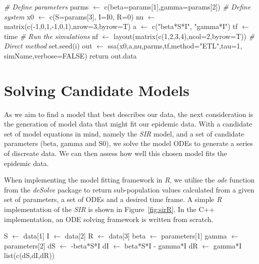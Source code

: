 \begin{algorithm}
  \begin{algorithmic}
    \State \emph{\# Define parameters}
    \State parms $\gets$ c(beta=params[1],gamma=params[2])
    \State
    \State \emph{\# Define system}
    \State x0 $\gets$ c(S=params[3], I=I0, R=0) 
    \State nu $\gets$ matrix(c(-1,0,1,-1,0,1),nrow=3,byrow=T)
    \State a  $\gets$ c("beta*S*I", "gamma*I")  
    \State tf $\gets$ time 
    \State
    \State \emph{\# Run the simulations}
    \State nf $\gets$ layout(matrix(c(1,2,3,4),ncol=2,byrow=T))
    \State
    \State \emph{\# Direct method}
    \State set.seed(i)
    \State out $\gets$ ssa(x0,a,nu,parms,tf,method="ETL",tau=1,
    simName,verbose=FALSE)
    \State return out.data
\EndFunction
\label{algorithm:gillespie}      
 
\end{algorithmic}
\end{algorithm}


\section{Solving Candidate Models}
As we aim to find a model that best describes our data, the next
consideration is the generation of model data that might fit our
epidemic data. With a candidate set of model equations in mind,
namely the \emph{SIR} model, and a set of candidate parameters (beta,
gamma and S0), we solve the model ODEs to generate a series of
discreate data. We can then assess how well this chosen model fits the
epidemic data.

When implementing the model fitting
framework in \emph{R}, we utilise the \emph{ode} function from the
\emph{deSolve} package to return sub-population values calculated from a
given set of parameters, a set of ODEs and a desired time frame. A
simple \emph{R} implementation of the \emph{SIR} is shown in
Figure~\ref{fig:sirR}. In the C++ implementation, an ODE solving
framework is written from scratch.

\begin{algorithm}
\label{fig:sirR}
\begin{algorithmic}
  \State S $\gets$ data[1]
  \State I $\gets$ data[2]
  \State R $\gets$ data[3]
  \State
  \State beta $\gets$ parameters[1]
  \State gamma $\gets$ parameters[2]
  \State
  \State dS $\gets$ -beta*S*I
  \State dI $\gets$ beta*S*I - gamma*I
  \State dR $\gets$ gamma*I
  \State
  \State list(c(dS,dI,dR))
  \EndFunction
\end{algorithmic}
\end{algorithm}
  
